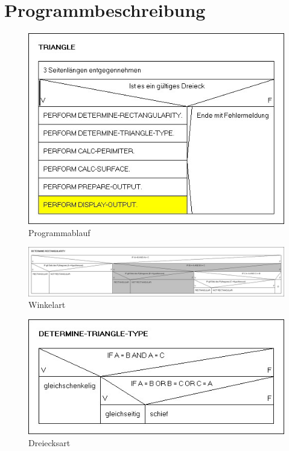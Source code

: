 \chapter{Programmbeschreibung}\label{ch:programmbeschreibung}


\begin{figure}
    \centering
    \includegraphics[width=\linewidth]{images/Programmablauf.jpg}
    \caption{Programmablauf}
\end{figure}



\begin{figure}
    \centering
    \includegraphics[width=\linewidth]{images/DETERMINE RECTANGULARITY.jpg}
    \caption{Winkelart}
\end{figure}

\begin{figure}
    \centering
    \includegraphics[width=\linewidth]{images/DETERMINE-TRIANGLE-TYPE.jpg}
    \caption{Dreiecksart}
\end{figure}

